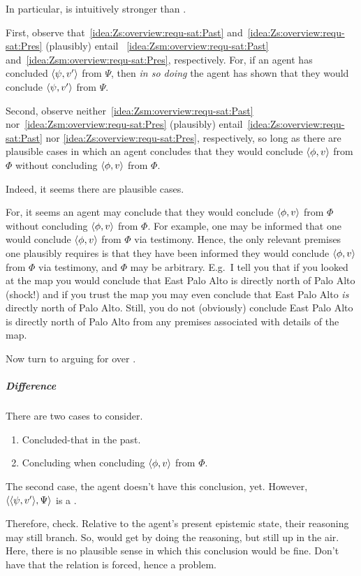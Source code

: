\begin{note}
  In particular, \iZs{} is intuitively stronger than \iZsm{}.

  First, observe that~\ref{idea:Zs:overview:requ-sat:Past} and~\ref{idea:Zs:overview:requ-sat:Pres} (plausibly) entail ~\ref{idea:Zsm:overview:requ-sat:Past} and~\ref{idea:Zsm:overview:requ-sat:Pres}, respectively.
  For, if an agent has concluded \(\langle \psi, v' \rangle\) from \(\Psi\), then \emph{in so doing} the agent has shown that they would conclude \(\langle \psi, v' \rangle\) from \(\Psi\).

  Second, observe neither~\ref{idea:Zsm:overview:requ-sat:Past} nor~\ref{idea:Zsm:overview:requ-sat:Pres} (plausibly) entail~\ref{idea:Zs:overview:requ-sat:Past} nor \ref{idea:Zs:overview:requ-sat:Pres}, respectively, so long as there are plausible cases in which an agent concludes that they would conclude \(\langle \phi, v \rangle\) from \(\Phi\) without concluding \(\langle \phi, v \rangle\) from \(\Phi\).

  Indeed, it seems there are plausible cases.

  For, it seems an agent may conclude that they would conclude \(\langle \phi, v \rangle\) from \(\Phi\) without concluding \(\langle \phi, v \rangle\) from \(\Phi\).
  For example, one may be informed that one would conclude \(\langle \phi, v \rangle\) from \(\Phi\) via testimony.
  Hence, the only relevant premises one plausibly requires is that they have been informed they would conclude \(\langle \phi, v \rangle\) from \(\Phi\) via testimony, and \(\Phi\) may be arbitrary.
  E.g.\ I tell you that if you looked at the map you would conclude that East Palo Alto is directly north of Palo Alto (shock!) and if you trust the map you may even conclude that East Palo Alto \emph{is} directly north of Palo Alto.
  Still, you do not (obviously) conclude East Palo Alto is directly north of Palo Alto from any premises associated with details of the map.
\end{note}

\begin{note}
  Now turn to arguing for \iCS{} over \iCSm{}.
\end{note}

\subparagraph{Difference}

\begin{note}
  There are two cases to consider.
  \begin{enumerate}
  \item
    Concluded-that in the past.
  \item
    Concluding when concluding \(\langle \phi, v \rangle\) from \(\Phi\).
  \end{enumerate}

  The second case, the agent doesn't have this conclusion, yet.
  However, \(\langle \langle \psi, v' \rangle, \Psi \rangle\) is a \requ{}.

  Therefore, check.
  Relative to the agent's present epistemic state, their reasoning may still branch.
  So, would get by doing the reasoning, but still up in the air.
  Here, there is no plausible sense in which this conclusion would be fine.
  Don't have that the relation is forced, hence a problem.
\end{note}

